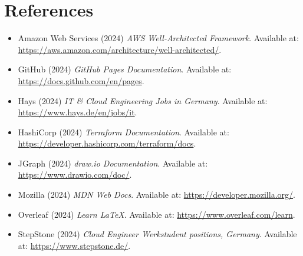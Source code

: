 \documentclass[11pt,a4paper]{article}
\begin{document}
\section*{References}
\begin{itemize}[leftmargin=*]
  \item Amazon Web Services (2024) \textit{AWS Well-Architected Framework}. Available at: \url{https://aws.amazon.com/architecture/well-architected/}.
  \item GitHub (2024) \textit{GitHub Pages Documentation}. Available at: \url{https://docs.github.com/en/pages}.
  \item Hays (2024) \textit{IT \& Cloud Engineering Jobs in Germany}. Available at: \url{https://www.hays.de/en/jobs/it}.
  \item HashiCorp (2024) \textit{Terraform Documentation}. Available at: \url{https://developer.hashicorp.com/terraform/docs}.
  \item JGraph (2024) \textit{draw.io Documentation}. Available at: \url{https://www.drawio.com/doc/}.
  \item Mozilla (2024) \textit{MDN Web Docs}. Available at: \url{https://developer.mozilla.org/}.
  \item Overleaf (2024) \textit{Learn LaTeX}. Available at: \url{https://www.overleaf.com/learn}.
  \item StepStone (2024) \textit{Cloud Engineer Werkstudent positions, Germany}. Available at: \url{https://www.stepstone.de/}.
\end{itemize}
\end{document}
